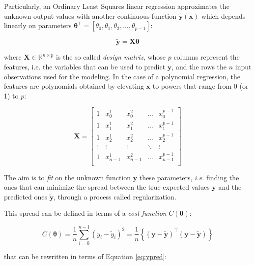 \documentclass[11pt,a4paper,twocolumn]{article}
\begin{document}
Particularly, an Ordinary Least Squares linear regression approximates the unknown output values with another
continuous function $\tilde{\boldsymbol{y}}(\boldsymbol{x})$ which depends linearly on parameters
$\boldsymbol{\theta}^\intercal=[\theta_0,\theta_1,\theta_2,\dots,\theta_{p-1}]$:

\begin{equation} \label{eq:ypred}
	\boldsymbol{\tilde{y}}= \boldsymbol{X}\boldsymbol{\theta}
\end{equation}

where $\boldsymbol{X} \in \mathbb{R}^{n \times p}$ is the so called \emph{design matrix}, whose $p$ columns represent the features, i.e. the variables that can be used to predict $\boldsymbol{y}$, and the rows the $n$ input observations used for the modeling. In the case of a polynomial regression, the features are polynomials obtained by elevating $\boldsymbol{x}$ to powers that range from 0 (or 1) to $p$:

\begin{equation}
	\boldsymbol{X}=
	\begin{bmatrix} 
		1& x_{0}^1 &x_{0}^2& \dots &x_{0}^{p-1}\\
		1& x_{1}^1 &x_{1}^2& \dots &x_{1}^{p-1}\\
		1& x_{2}^1 &x_{2}^2& \dots  &x_{2}^{p-1}\\                      
		\vdots& \vdots &\vdots& \ddots &\vdots\\
		1& x_{n-1}^1 &x_{n-1}^2& \dots &x_{n-1}^{p-1}\\
	\end{bmatrix}
\end{equation}


The aim is to \emph{fit} on the unknown function $\boldsymbol{y}$ these parameters, \emph{i.e.} finding the ones that can minimize the spread between the true expected values $\boldsymbol{y}$ and the predicted ones $\tilde{\boldsymbol{y}}$, through a process called regularization.

This spread can be defined in terms of a \emph{cost function} $C(\boldsymbol{\theta})$:

\begin{equation}
	C(\boldsymbol{\theta})=\frac{1}{n}\sum_{i=0}^{n-1}\left(y_i-\tilde{y}_i\right)^2=\frac{1}{n}\left\{\left(\boldsymbol{y}-\boldsymbol{\tilde{y}}\right)^\intercal \left(\boldsymbol{y}-\boldsymbol{\tilde{y}}\right)\right\}
\end{equation}

that can be rewritten in terms of Equation \eqref{eq:ypred}:
\end{document}
